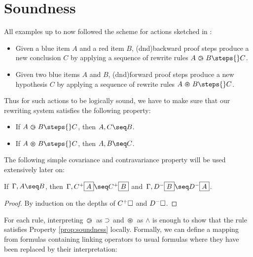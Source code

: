 \section{Soundness}


All examples up to now followed the scheme for  actions sketched in
:
\begin{itemize}
  \item Given a blue item $A$ and a red item $B$, \kl(dnd){backward} proof steps produce a
  new conclusion $C$ by applying a sequence of rewrite rules $A \back B \steps{}
  C$.
  \item Given two blue items $A$ and $B$, \kl(dnd){forward} proof steps produce a new
  hypothesis $C$ by applying a sequence of rewrite rules $A \forw B \steps{} C$.
\end{itemize}

Thus for such actions to be logically sound, we have to make sure that our
rewriting system satisfies the following property:

\begin{theorem}[Soundness]\label{prop:soundness}
  \phantom{a}
  \begin{itemize}
    \item If $A \back B \steps{} C$, then $A, C \seq B$.
    \item If $A \forw B \steps{} C$, then $A, B \seq C$.
  \end{itemize}
\end{theorem}

The following simple covariance and contravariance property will be used
extensively later on:
\begin{lemma}[Variance]\label{prop:cov}
  If $\, \Gamma, A\seq B$, then $\, \Gamma, C^+\select{A}\seq C^+\select{B}$
  and $\, \Gamma, D^-\select{B}\seq D^-\select{A}$.
\end{lemma}
\begin{proof}
  By induction on the depths of $C^+\square$ and $D^-\square$.
\end{proof}

For each rule, interpreting $\operatorname{\,\varogreaterthan\,}$ as $\supset$ and $\operatorname{\,\varoast\,}$ as $\land$ is enough
to show that the rule satisfies Property \ref{prop:soundness} locally. Formally,
we can define a mapping from formulas containing linking operators to usual
formulas where they have been replaced by their interpretation:

